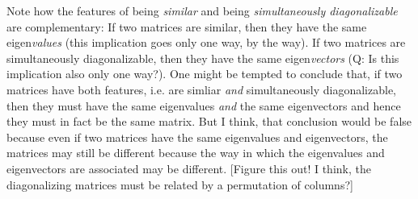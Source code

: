 \medskip
Note how the features of being \emph{similar} and being \emph{simultaneously diagonalizable} are complementary: If two matrices are similar, then they have the same eigen\emph{values} (this implication goes only one way, by the way). If two matrices are simultaneously diagonalizable, then they have the same eigen\emph{vectors} (Q: Is this implication also only one way?). One might be tempted to conclude that, if two matrices have both features, i.e. are simliar \emph{and} simultaneously diagonalizable, then they must have the same eigenvalues \emph{and} the same eigenvectors and hence they must in fact be the same matrix. But I think, that conclusion would be false because even if two matrices have the same eigenvalues and eigenvectors, the matrices may still be different because the way in which the eigenvalues and eigenvectors are associated may be different. [Figure this out! I think, the diagonalizing matrices must be related by a permutation of columns?]








